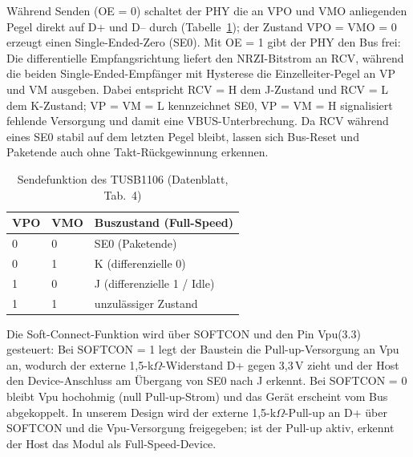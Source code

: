 \documentclass[a4paper,11pt]{article}
\begin{document}
Während Senden (OE = 0) schaltet der PHY die an VPO und VMO anliegenden Pegel direkt auf D+ und D-- durch (Tabelle~\ref{tab:tusb_drive}); der Zustand VPO = VMO = 0 erzeugt einen Single-Ended-Zero (SE0). Mit OE = 1 gibt der PHY den Bus frei: Die differentielle Empfangsrichtung liefert den NRZI-Bitstrom an RCV, während die beiden Single-Ended-Empfänger mit Hysterese die Einzelleiter-Pegel an VP und VM ausgeben. Dabei entspricht RCV = H dem J-Zustand und RCV = L dem K-Zustand; VP = VM = L kennzeichnet SE0, VP = VM = H signalisiert fehlende Versorgung und damit eine VBUS-Unterbrechung. Da RCV während eines SE0 stabil auf dem letzten Pegel bleibt, lassen sich Bus-Reset und Paketende auch ohne Takt-Rückgewinnung erkennen.

\begin{table}[H]
	\centering
	\begin{tabular}{|l|l|l|}
		\hline
		\textbf{VPO} & \textbf{VMO} & \textbf{Buszustand (Full-Speed)} \\ \hline
		0            & 0            & SE0 (Paketende)                  \\ \hline
		0            & 1            & K (differenzielle 0)             \\ \hline
		1            & 0            & J (differenzielle 1 / Idle)      \\ \hline
		1            & 1            & unzulässiger Zustand             \\ \hline
	\end{tabular}
	\caption{Sendefunktion des TUSB1106 (Datenblatt, Tab.~4)}
	\label{tab:tusb_drive}
\end{table}

Die Soft-Connect-Funktion wird über SOFTCON und den Pin Vpu(3.3) gesteuert: Bei SOFTCON = 1 legt der Baustein die Pull-up-Versorgung an Vpu an, wodurch der externe 1,5-k$\Omega$-Widerstand D+ gegen 3,3\,V zieht und der Host den Device-Anschluss am Übergang von SE0 nach J erkennt. Bei SOFTCON = 0 bleibt Vpu hochohmig (null Pull-up-Strom) und das Gerät erscheint vom Bus abgekoppelt. In unserem Design wird der externe 1,5-k$\Omega$-Pull-up an D+ über SOFTCON und die Vpu-Versorgung freigegeben; ist der Pull-up aktiv, erkennt der Host das Modul als Full-Speed-Device.
\end{document}

